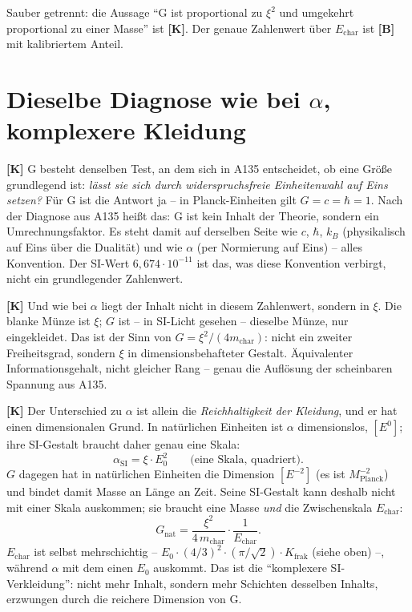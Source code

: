 Sauber getrennt: die Aussage \enquote{G ist proportional zu $\xi^2$ und
umgekehrt proportional zu einer Masse} ist \textbf{[K]}. Der genaue
Zahlenwert über $E_\text{char}$ ist \textbf{[B]} mit kalibriertem Anteil.

\section{Dieselbe Diagnose wie bei $\alpha$, komplexere Kleidung}

\textbf{[K]} G besteht denselben Test, an dem sich in A135 entscheidet, ob eine
Größe grundlegend ist: \emph{lässt sie sich durch widerspruchsfreie
Einheitenwahl auf Eins setzen?} Für G ist die Antwort ja -- in Planck-Einheiten
gilt $G = c = \hbar = 1$. Nach der Diagnose aus A135 heißt das: G ist kein
Inhalt der Theorie, sondern ein Umrechnungsfaktor. Es steht damit auf derselben
Seite wie $c$, $\hbar$, $k_B$ (physikalisch auf Eins über die Dualität) und wie
$\alpha$ (per Normierung auf Eins) -- alles Konvention. Der SI-Wert
$6{,}674\cdot10^{-11}$ ist das, was diese Konvention verbirgt, nicht ein
grundlegender Zahlenwert.

\textbf{[K]} Und wie bei $\alpha$ liegt der Inhalt nicht in diesem Zahlenwert,
sondern in $\xi$. Die blanke Münze ist $\xi$; $G$ ist -- in SI-Licht gesehen --
dieselbe Münze, nur eingekleidet. Das ist der Sinn von $G = \xi^2/(4m_\text{char})$:
nicht ein zweiter Freiheitsgrad, sondern $\xi$ in dimensionsbehafteter Gestalt.
Äquivalenter Informationsgehalt, nicht gleicher Rang -- genau die Auflösung der
scheinbaren Spannung aus A135.

\textbf{[K]} Der Unterschied zu $\alpha$ ist allein die \emph{Reichhaltigkeit
der Kleidung}, und er hat einen dimensionalen Grund. In natürlichen Einheiten
ist $\alpha$ dimensionslos, $[E^0]$; ihre SI-Gestalt braucht daher genau eine
Skala:
\[
  \alpha_\text{SI} = \xi\cdot E_0^2 \qquad\text{(eine Skala, quadriert).}
\]
$G$ dagegen hat in natürlichen Einheiten die Dimension $[E^{-2}]$
(es ist $M_\text{Planck}^{-2}$) und bindet damit Masse an Länge an Zeit. Seine
SI-Gestalt kann deshalb nicht mit einer Skala auskommen; sie braucht eine Masse
\emph{und} die Zwischenskala $E_\text{char}$:
\[
  G_\text{nat} = \frac{\xi^2}{4\,m_\text{char}}\cdot\frac{1}{E_\text{char}}.
\]
$E_\text{char}$ ist selbst mehrschichtig -- $E_0\cdot(4/3)^2\cdot(\pi/\sqrt2)\cdot
K_\text{frak}$ (siehe oben) --, während $\alpha$ mit dem einen $E_0$ auskommt.
Das ist die \enquote{komplexere SI-Verkleidung}: nicht mehr Inhalt, sondern mehr
Schichten desselben Inhalts, erzwungen durch die reichere Dimension von G.

